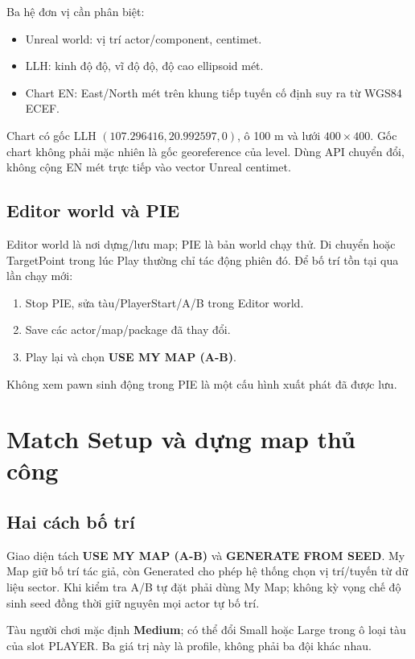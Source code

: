 Ba hệ đơn vị cần phân biệt:
\begin{itemize}
 \item Unreal world: vị trí actor/component, centimet.
 \item LLH: kinh độ độ, vĩ độ độ, độ cao ellipsoid mét.
 \item Chart EN: East/North mét trên khung tiếp tuyến cố định suy ra từ WGS84 ECEF.
\end{itemize}
Chart có gốc LLH \((107.296416,20.992597,0)\), ô 100 m và lưới \(400\times400\). Gốc chart không phải mặc nhiên là gốc georeference của level. Dùng API chuyển đổi, không cộng EN mét trực tiếp vào vector Unreal centimet.

\section{Editor world và PIE}
Editor world là nơi dựng/lưu map; PIE là bản world chạy thử. Di chuyển  hoặc TargetPoint trong lúc Play thường chỉ tác động phiên đó. Để bố trí tồn tại qua lần chạy mới:
\begin{enumerate}
 \item Stop PIE, sửa tàu/PlayerStart/A/B trong Editor world.
 \item Save các actor/map/package đã thay đổi.
 \item Play lại và chọn \textbf{USE MY MAP (A-B)}.
\end{enumerate}
Không xem pawn sinh động trong PIE là một cấu hình xuất phát đã được lưu.

\chapter{Match Setup và dựng map thủ công}
\label{chap:setup}

\section{Hai cách bố trí}
Giao diện tách \textbf{USE MY MAP (A-B)} và \textbf{GENERATE FROM SEED}. My Map giữ bố trí tác giả, còn Generated cho phép hệ thống chọn vị trí/tuyến từ dữ liệu sector. Khi kiểm tra A/B tự đặt phải dùng My Map; không kỳ vọng chế độ sinh seed đồng thời giữ nguyên mọi actor tự bố trí.

Tàu người chơi mặc định \textbf{Medium}; có thể đổi Small hoặc Large trong ô loại tàu của slot PLAYER. Ba giá trị này là profile, không phải ba đội khác nhau.

